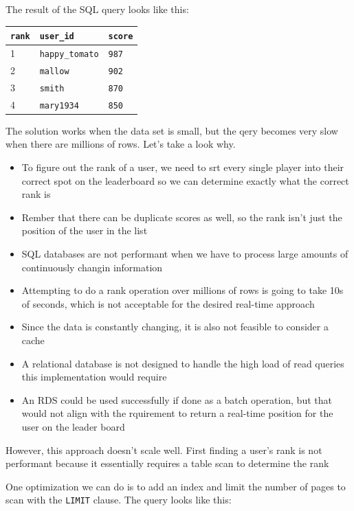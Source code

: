 \documentclass{report}
\theoremstyle{definition}
\begin{document}
The result of the SQL query looks like this:

\begin{tabular}{|p{4cm}|p{4cm}|p{4cm}|}
\hline
\lstinline|rank| & \lstinline|user_id| & \lstinline|score| \\
\hline
1 & \lstinline|happy_tomato| & \lstinline|987| \\
\hline
2 & \lstinline|mallow| & \lstinline|902| \\
\hline
3 & \lstinline|smith| & \lstinline|870| \\
\hline
4 & \lstinline|mary1934| & \lstinline|850| \\
\hline
\end{tabular}

The solution works when the data set is small, but the qery becomes very slow when there are millions of rows. Let's take a look why.

\begin{itemize}
\item
To figure out the rank of a user, we need to srt every single player into their correct spot on the leaderboard so we can determine exactly what the correct rank is
\item
Rember that there can be duplicate scores as well, so the rank isn't just the position of the user in the list
\item
SQL databases are not performant when we have to process large amounts of continuously changin information
\item
Attempting to do a rank operation over millions of rows is going to take 10s of seconds, which is not acceptable for the desired real-time approach
\item
Since the data is constantly changing, it is also not feasible to consider a cache
\item
A relational database is not designed to handle the high load of read queries this implementation would require
\item
An RDS could be used successfully if done as a batch operation, but that would not align with the rquirement to return a real-time position for the user on the leader board
\end{itemize}


However, this approach doesn't scale well. First finding a user's rank is not performant because it essentially requires a table scan to determine the rank

One optimization we can do is to add an index and limit the number of pages to scan with the \lstinline|LIMIT| clause. The query looks like this:
\end{document}
